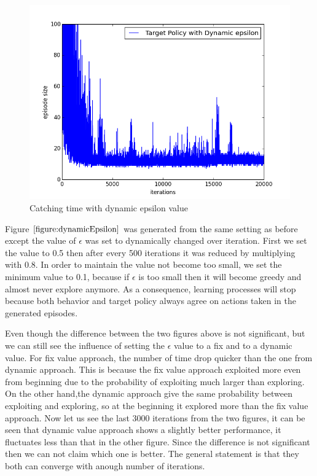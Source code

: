 \documentclass[paper=a4, fontsize=11pt]{scrartcl}
\numberwithin{equation}{section}		%
\numberwithin{figure}{section}			%
\numberwithin{table}{section}				%
\begin{document}
\begin{figure}[H] \centering
\includegraphics[scale=0.5]{target_dynamic_0_5_0_8_0_05.png}
\caption{Catching time with dynamic epsilon value}\label{figure:dynamicEpsilon} \label{figure:dynamicEpsilon}
\end{figure}

Figure $\ref{figure:dynamicEpsilon}$ was generated from the same setting as before except the value of $\epsilon$ was set to dynamically changed over iteration. First we set the value to 0.5 then after every 500 iterations it was reduced by multiplying with 0.8. In order to maintain the value not become too small, we set the minimum value to 0.1, because if $\epsilon$ is too small then it will become greedy and almost never explore anymore. As a consequence, learning processes will stop because both behavior and target policy always agree on actions taken in the generated episodes.

Even though the difference between the two figures above is not significant, but we can still see the influence of setting the $\epsilon$ value to a fix and to a dynamic value. For fix value approach, the number of time drop quicker than the one from dynamic approach. This is because the fix value approach exploited more even from beginning due to the probability of exploiting much larger than exploring. On the other hand,the dynamic approach give the same probability between exploiting and exploring, so at the beginning it explored more than the fix value approach. Now let us see the last 3000 iterations from the two figures, it can be seen that dynamic value approach shows a slightly better performance, it fluctuates less than that in the other figure. Since the difference is not significant then we can not claim which one is better. The general statement is that they both can converge with anough number of iterations.
\end{document}

